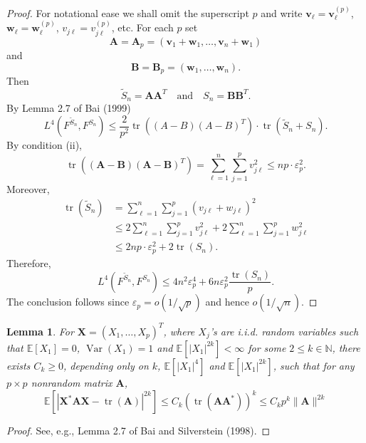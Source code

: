 \documentclass[a4paper,11pt]{book}
\theoremstyle{plain}
\newtheorem{lmm}[thm]{Lemma}
\theoremstyle{definition}
\newcommand{\ME}{\mathbb{E}}
\newcommand{\MN}{\mathbb{N}}
\newcommand{\Var}{\operatorname{Var}}
\newcommand{\tr}{\operatorname{tr}}
\begin{document}
    \begin{proof}
    	For notational ease we shall omit the superscript $p$ and write $\mathbf{v}_\ell = \mathbf{v}_\ell^{(p)}$, $\mathbf{w}_\ell = \mathbf{w}_\ell^{(p)}$, $v_{j\ell} = v_{j\ell}^{(p)}$, etc. For each $p$ set 
    	\[ \mathbf{A} = \mathbf{A}_p = (\mathbf{v}_1 + \mathbf{w}_1, \dots, \mathbf{v}_n + \mathbf{w}_1) \]
    	and
    	\[ \mathbf{B} = \mathbf{B}_p = (\mathbf{w}_1, \dots,  \mathbf{w}_n). \]
    	Then
    	\[ \widetilde{S}_n = \mathbf{AA}^T \quad \text{and} \quad S_n = \mathbf{BB}^T. \]
    	By Lemma 2.7 of Bai (1999)
    	\[L^4(F^{\widetilde{S}_n}, F^{S_n}) \leq \frac{2}{p^2} \tr((A-B)(A-B)^T) \cdot \tr(\widetilde{S}_n + S_n). \]
    	By condition (ii),
    	\[ \tr((\mathbf{A}-\mathbf{B})(\mathbf{A}-\mathbf{B})^T)  = \sum_{\ell=1}^{n} \sum_{j=1}^{p} v_{j\ell}^2 \leq np \cdot \varepsilon_p^2. \]
    	Moreover,
    	\[
    	\begin{aligned}
    	\tr(\widetilde{S}_n) &= \sum_{\ell=1}^{n} \sum_{j=1}^{p} (v_{j\ell} + w_{j\ell})^2 \\
    	& \leq 2 \sum_{\ell=1}^{n} \sum_{j=1}^{p} v_{j\ell}^2 + 2\sum_{\ell=1}^{n} \sum_{j=1}^{p} w_{j\ell}^2 \\
    	& \leq 2np \cdot \varepsilon_p^2 + 2 \tr(S_n).
    	\end{aligned}
    	 \]
    	 Therefore,
    	 \[L^4(F^{\widetilde{S}_n}, F^{S_n}) \leq 4n^2\varepsilon_p^4 + 6n\varepsilon_p^2 \frac{\tr(S_n)}{p}. \]
    	 The conclusion follows since $\varepsilon_p = o(1/\sqrt{p})$ and hence $o(1/\sqrt{n})$.
    \end{proof}
    
    \begin{lmm} \label{lmm 9}
    	For $\mathbf{X} = (X_1, \dots, X_p)^T$, where $X_j$'s are i.i.d. random variables such that $\ME[X_1] = 0$, $\Var(X_1) = 1$ and $\ME[|X_1|^{2k}] < \infty$ for some $2 \leq k \in \MN$, there exists $C_k \geq 0$, depending only on $k$, $\ME[|X_1|^4]$ and $\ME[|X_1|^{2k}]$, such that for any $p \times p$ nonrandom matrix $\mathbf{A}$,
    	\[ \ME[|\mathbf{X}^* \mathbf{A} \mathbf{X} - \tr(\mathbf{A}) |^{2k}] \leq C_k(\tr(\mathbf{AA}^*))^k \leq C_k p^k \|\mathbf{A} \|^{2k}  \]
    \end{lmm}
    \begin{proof}
    	See, e.g., Lemma 2.7 of Bai and Silverstein (1998).
    \end{proof}
    
\end{document}
